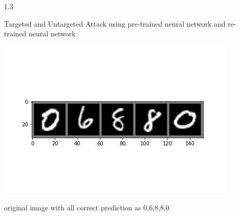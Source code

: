 \documentclass{article}
\begin{document}
\begin{enumerate}
        \item[1.3] 
        
    	Targeted and Untargeted Attack using pre-trained neural network and re-trained neural network\\
	    \begin{minipage}[t]{\linewidth}
    	\captionsetup{type=figure}
        \centering
        \includegraphics[width=0.65\linewidth]{image/pre_batch_untarget_original_image.png}
        \caption{original image with all correct prediction as 0,6,8,8,0} 
        \label{original image with all correct prediction as 0,6,8,8,0}     
        \end{minipage}
        

\end{enumerate}
\end{document}
